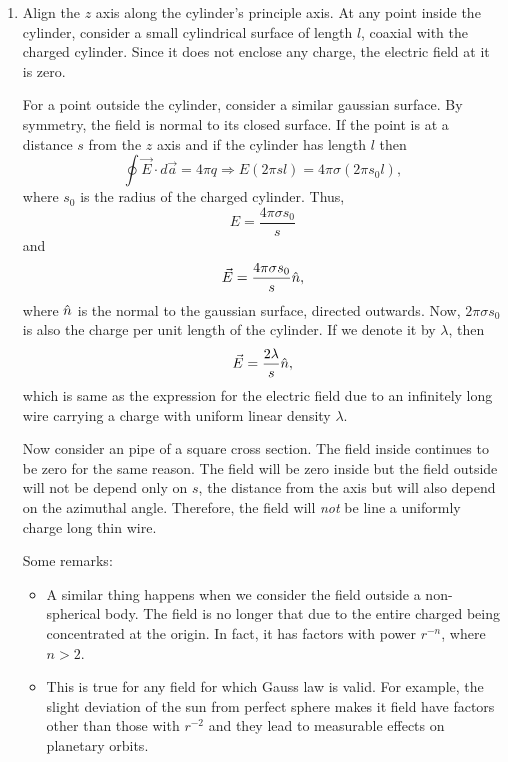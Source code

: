 \documentclass{article}
\begin{document}
\begin{enumerate}
\item Align the $z$ axis along the cylinder's principle axis. At any point inside
the cylinder, consider a small cylindrical surface of length $l$, coaxial
with the charged cylinder. Since it does not enclose any charge, the electric
field at it is zero. 

For a point outside the cylinder, consider a similar gaussian surface. By symmetry,
the field is normal to its closed surface. If the point is at a distance $s$ from
the $z$ axis and if the cylinder has length $l$ then
\[
\oint\vec{E}\cdot d\vec{a} = 4\pi q \Rightarrow E(2\pi sl) = 4\pi\sigma(2\pi s_0l),
\]
where $s_0$ is the radius of the charged cylinder. Thus,
\[
E = \frac{4\pi\sigma s_0}{s}
\]
and
\[
\vec{E} = \frac{4\pi\sigma s_0}{s}\hat{n},
\]
where $\hat{n}$ is the normal to the gaussian surface, directed outwards. Now, $2\pi
\sigma s_0$ is also the charge per unit length of the cylinder. If we denote it 
by $\lambda$, then
\[
\vec{E} = \frac{2\lambda}{s}\hat{n},
\]
which is same as the expression for the electric field due to an infinitely long
wire carrying a charge with uniform linear density $\lambda$.

Now consider an pipe of a square cross section. The field inside continues to be
zero for the same reason. The field will be zero inside but the field outside will
not be depend only on $s$, the distance from the axis but will also depend on the
azimuthal angle. Therefore, the field will \emph{not} be line a uniformly charge
long thin wire.

Some remarks:
\begin{itemize}
\item A similar thing happens when we consider the field outside a non-spherical
body. The field is no longer that due to the entire charged being concentrated at 
the origin. In fact, it has factors with power $r^{-n}$, where $n > 2$.
\item This is true for any field for which Gauss law is valid. For example, the
slight deviation of the sun from perfect sphere makes it field have factors other
than those with $r^{-2}$ and they lead to measurable effects on planetary orbits.
\end{itemize}



\end{enumerate}
\end{document}
